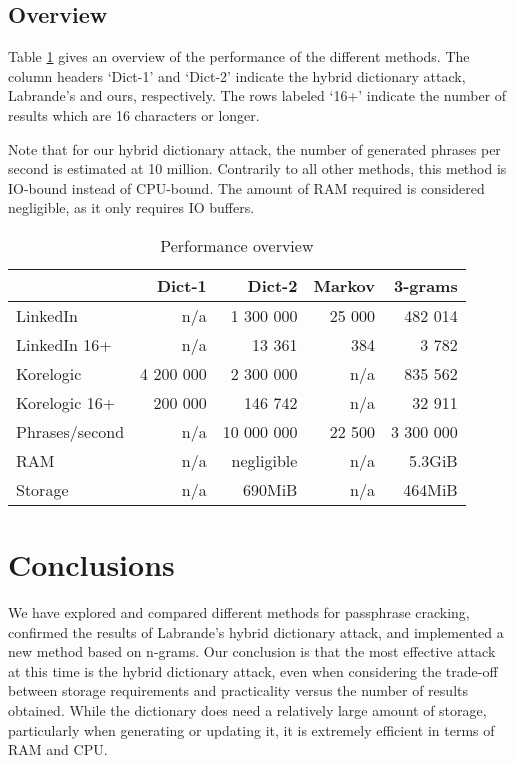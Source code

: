 \documentclass{article}
\begin{document}
\subsection{Overview}

Table \ref{tab:comparison} gives an overview of the performance of the
different methods. The column headers `Dict-1' and `Dict-2' indicate the hybrid
dictionary attack, Labrande's and ours, respectively. The rows labeled `16+'
indicate the number of results which are 16 characters or longer.

Note that for our hybrid dictionary attack, the number of generated phrases per
second is estimated at 10 million. Contrarily to all other methods, this method
is IO-bound instead of CPU-bound. The amount of RAM required is considered
negligible, as it only requires IO buffers.

\begin{table}[H]
	\begin{tabular}{| l | r | r | r | r | }
	\hline                & {\bf Dict-1} & {\bf Dict-2} & {\bf Markov} & {\bf 3-grams} \\
	\hline LinkedIn       & n/a          &  1 300 000   &    25 000    &   482 014     \\
	\hline LinkedIn 16+   & n/a          &     13 361   &       384    &     3 782     \\
	\hline Korelogic      & 4 200 000    &  2 300 000   & n/a          &   835 562     \\
	\hline Korelogic 16+  &   200 000    &    146 742   & n/a          &    32 911     \\
	\hline Phrases/second & n/a          & 10 000 000   &    22 500    & 3 300 000     \\
	\hline RAM            & n/a          & negligible   & n/a          & 5.3GiB        \\
	\hline Storage        & n/a          &     690MiB   & n/a          & 464MiB        \\
	\hline
	\end{tabular}
	\caption{Performance overview}
	\label{tab:comparison}
\end{table}


\section{Conclusions}\label{sec:conclusions}

We have explored and compared different methods for passphrase cracking,
confirmed the results of Labrande's hybrid dictionary attack, and implemented a
new method based on n-grams. Our conclusion is that the most effective attack
at this time is the hybrid dictionary attack, even when considering the
trade-off between storage requirements and practicality versus the number of
results obtained. While the dictionary does need a relatively large amount of
storage, particularly when generating or updating it, it is extremely efficient
in terms of RAM and CPU.
\end{document}
